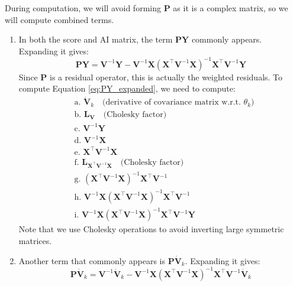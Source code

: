 \documentclass[
  letterpaper,
  DIV=11,
  numbers=noendperiod]{scrartcl}
\begin{document}
During computation, we will avoid forming \(\symbf{P}\) as it is a
complex matrix, so we will compute combined terms.

\begin{enumerate}
\def\labelenumi{\arabic{enumi}.}
\item
  In both the score and AI matrix, the term \(\symbf{P}\symbf{Y}\)
  commonly appears. Expanding it gives: \begin{equation}
  \symbf{P}\symbf{Y} = \symbf{V}^{-1}\symbf{Y} - \symbf{V}^{-1}\symbf{X}(\symbf{X}^\top\symbf{V}^{-1}\symbf{X})^{-1}\symbf{X}^\top\symbf{V}^{-1}\symbf{Y}
  \label{eq:PY_expanded}
  \end{equation} Since \(\symbf{P}\) is a residual operator, this is
  actually the weighted residuals. To compute Equation
  \eqref{eq:PY_expanded}, we need to compute: \begin{align}
  &\text{a. } \dot{\symbf{V}}_k \quad \text{(derivative of covariance matrix w.r.t. $\theta_k$)} \nonumber \\
  &\text{b. } \symbf{L}_{\symbf{V}} \quad \text{(Cholesky factor)} \nonumber \\
  &\text{c. } \symbf{V}^{-1} \symbf{Y} \nonumber \\
  &\text{d. } \symbf{V}^{-1} \symbf{X} \nonumber \\
  &\text{e. } \symbf{X}^\top \symbf{V}^{-1} \symbf{X} \nonumber \\
  &\text{f. } \symbf{L}_{\symbf{X}^\top \symbf{V}^{-1} \symbf{X}} \quad \text{(Cholesky factor)} \nonumber \\
  &\text{g. } (\symbf{X}^\top \symbf{V}^{-1} \symbf{X})^{-1} \symbf{X}^\top \symbf{V}^{-1} \nonumber \\
  &\text{h. } \symbf{V}^{-1} \symbf{X} (\symbf{X}^\top \symbf{V}^{-1} \symbf{X})^{-1} \symbf{X}^\top \symbf{V}^{-1} \nonumber \\
  &\text{i. } \symbf{V}^{-1} \symbf{X} (\symbf{X}^\top \symbf{V}^{-1} \symbf{X})^{-1} \symbf{X}^\top \symbf{V}^{-1} \symbf{Y} \nonumber
  \end{align} Note that we use Cholesky operations to avoid inverting
  large symmetric matrices.
\item
  Another term that commonly appears is \(\symbf{P} \dot{\symbf{V}}_k\).
  Expanding it gives: \begin{equation}
  \symbf{P} \dot{\symbf{V}}_k = \symbf{V}^{-1}\dot{\symbf{V}}_k - \symbf{V}^{-1}\symbf{X}(\symbf{X}^\top\symbf{V}^{-1}\symbf{X})^{-1}\symbf{X}^\top\symbf{V}^{-1}\dot{\symbf{V}}_k
  \label{eq:P_Sigma_expanded}

\end{equation}
\end{enumerate}
\end{document}
